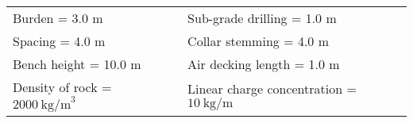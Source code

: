\begin{tabular}{ll}
Burden = 3.0 m & Sub-grade drilling = 1.0 m \\
Spacing = 4.0 m & Collar stemming = 4.0 m \\
Bench height = 10.0 m & Air decking length = 1.0 m \\
Density of rock = $2000 \ \text{kg/m}^3$ & Linear charge concentration = $10 \ \text{kg/m}$ \\
\end{tabular}
